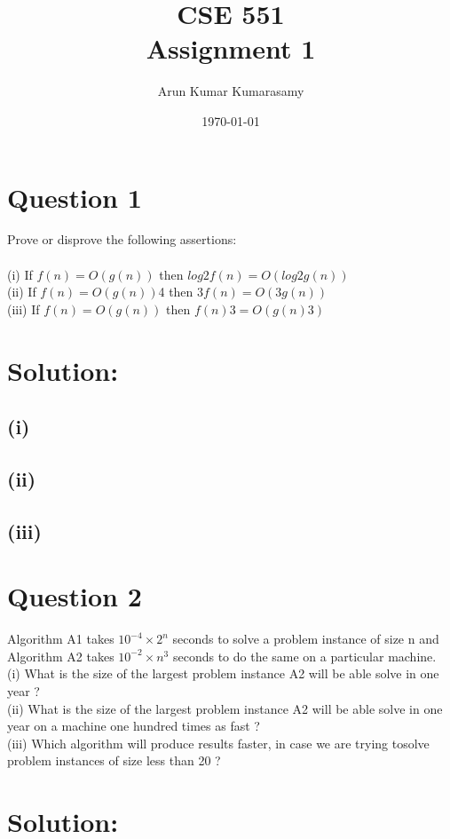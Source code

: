 \documentclass[a4paper,12pt]{article}
\begin{document}
\title {\textbf {CSE 551
\\Assignment 1}}
\author {Arun Kumar Kumarasamy}
\date{\today}
\maketitle

\section*{Question 1}
 Prove or disprove the following assertions:\\ \\(i) If $f(n) =O(g(n))$ then $log2f(n) =O(log2g(n))$\\(ii) If $f(n) =O(g(n))$4 then $3f(n)=O(3g(n))$\\(iii) If $f(n) =O(g(n))$ then $f(n)3=O(g(n)3)$ 
\section*{Solution:}
\subsection*{(i)} 
\subsection*{(ii)} 
\subsection*{(iii)}

\section*{Question 2}
Algorithm A1 takes $10^{-4} \times 2^{n}$ seconds to solve a problem instance of size n and Algorithm A2 takes $10^{-2} \times n^{3}$ seconds to do the same on a particular machine.\\(i) What is the size of the largest problem instance A2 will be able solve in one year ?\\(ii) What is the size of the largest problem instance A2 will be able solve in one year on a machine one hundred times as fast ?\\(iii) Which algorithm will produce results faster, in case we are trying tosolve problem instances of size less than 20 ?
\section*{Solution:}
\end{document}
